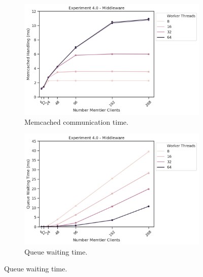 \begin{figure}
{\begin{subfigure}[t!]{0.55\textwidth}
                    \centering
                    \includegraphics[width=1\textwidth]{../data_analysis/figures/4-0_mw_mc-comm-time.png}
                    \caption{Memcached communication time.\label{fig:sets_mw_mct}}
                \end{subfigure}
                \begin{subfigure}[t!]{0.55\textwidth}
                    \centering
                    \includegraphics[width=1\textwidth]{../data_analysis/figures/4-0_mw_queue-wait-time.png}
                    \caption{Queue waiting time.\label{fig:sets_mw_qwt}}
                \end{subfigure}
            }
\end{figure}
